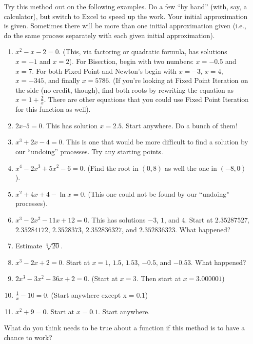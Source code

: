 \documentclass{ximera}
\begin{document}
\begin{problem}

Try this method out on the following examples.  Do a few “by hand” (with, say, a calculator), but switch to Excel to speed up the work.  Your initial approximation is given.  Sometimes there will be more than one initial approximation given (i.e., do the same process separately with each given initial approximation).

\begin{enumerate}
\item $x^2-x-2=0$.  (This, via factoring or quadratic formula, has solutions $x = -1$ and $x = 2$).  For Bisection, begin with two numbers: $x = -0.5$ and $x = 7$.  For both Fixed Point and Newton’s begin with  $x = -3$, $x=4$, $x=-345$, and finally $x = 5786$.   (If you’re looking at Fixed Point Iteration on the side (no credit, though), find both roots by rewriting the equation as  $x=1+\frac{2}{x}$.  There are other equations that you could use Fixed Point Iteration for this function as well).

\item  $2x – 5 = 0$. This has solution $x = 2.5$. Start anywhere.  Do a bunch of them! 

\item $x^3+2x-4=0$.   This is one that would be more difficult to find a solution by our ``undoing'' processes.  Try any starting points. 

\item $x^4-2x^3+5x^2-6=0$.   (Find the root in $(0, 8)$ as well the one in $(-8, 0)$).

\item $x^2+4x+4-\ln x = 0$.   (This one could not be found by our ``undoing'' processes).

\item  $x^3-2x^2-11x+12 =0$.  This has solutions $-3$, $1$, and $4$.  Start at $2.35287527$, $2.35284172$, $2.3528373$, $2.352836327$, and $2.352836323$.  What happened?

\item 	Estimate  $\sqrt[5]{20}$.

\item $x^3-2x+2=0$.   Start at $x = 1$, $1.5$, $1.53$, $-0.5$, and $-0.53$.  What happened?

\item $2x^3-3x^2-36x+2=0$.   (Start at $x = 3$.  Then start at $x = 3.000001$)

\item $\frac{1}{x}-10 = 0$. (Start anywhere except x = 0.1)

\item $x^2+9=0$. Start at $x = 0.1$.  Start anywhere.
\end{enumerate}
\end{problem}

\begin{problem}

What do you think needs to be true about a function if this method is to have a chance to work?
\end{problem}
\end{document}
